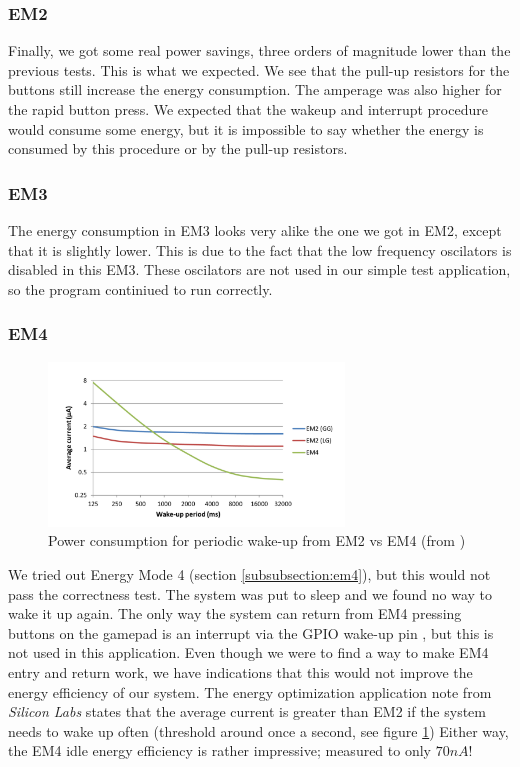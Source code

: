 		\subsubsection{EM2}
		Finally, we got some real power savings, three orders of magnitude lower than the previous tests. This is what we expected. We see that the pull-up resistors for the buttons still increase the energy consumption. The amperage was also higher for the rapid button press. We expected that the wakeup and interrupt procedure would consume some energy, but it is impossible to say whether the energy is consumed by this procedure or by the pull-up resistors.

		\subsubsection{EM3}
		The energy consumption in EM3 looks very alike the one we got in EM2, except that it is slightly lower. This is due to the fact that the low frequency oscilators is disabled in this EM3. These oscilators are not used in our simple test application, so the program continiued to run correctly.
		\subsubsection{EM4}
		\begin{figure}[t]
			\centerline{
				\includegraphics[width=0.7\textwidth]{img/em2vsem4.png}
			}
			\caption{Power consumption for periodic wake-up from EM2 vs EM4 (from \cite[p. 9]{energy_optimization_application_note})}
			\label{fig:em2vsem4}
			
		\end{figure}
		We tried out Energy Mode 4 (section \ref{subsubsection:em4}), but this would not pass the correctness test. The system was put to sleep and we found no way to wake it up again. The only way the system can return from EM4 pressing buttons on the gamepad is an interrupt via the GPIO wake-up pin \cite[p. 8]{reference_manual}, but this is not used in this application. Even though we were to find a way to make EM4 entry and return work, we have indications that this would not improve the energy efficiency of our system. The energy optimization application note from \emph{Silicon Labs} states that the average current is greater than EM2 if the system needs to wake up often (threshold around once a second, see figure \ref{fig:em2vsem4})  Either way, the EM4 idle energy efficiency is rather impressive; measured to only $70nA$!

